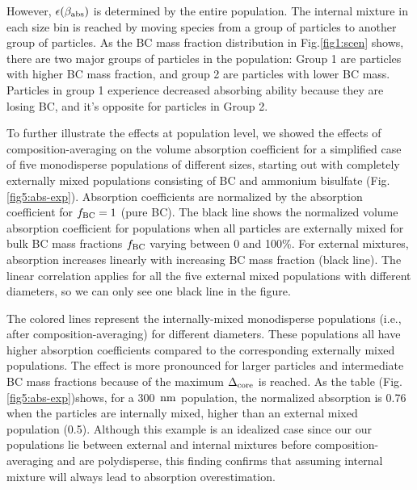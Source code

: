 \documentclass[edeposit,fullpage]{uiucthesis2009}
\makeatletter
\DeclareRobustCommand*\unit[1]
 {\ensuremath{%
   {\thinmuskip3mu\relax
    \def\mu{\text{\textmu}}\def~{\,}%
    \ifx\f@series\testbx\mathbf{#1}\else\mathrm{#1}\fi}}}
\makeatother
\begin{document}

However, $\epsilon(\beta_{\rm abs})$ is determined by the entire
population. The internal mixture in each size bin is reached by
moving species from a group of particles to another group of
particles.  As the BC mass fraction distribution  in
Fig.\ref{fig1:scen} shows, there are two major groups of particles in
the population: Group 1 are particles with higher BC mass fraction,
and group 2 are particles with lower BC mass. Particles in group 1
experience decreased absorbing ability because they are losing BC, and
it's opposite for particles in Group 2.

To further illustrate the effects at population level, we showed the effects of
composition-averaging on the volume absorption coefficient for a
simplified case of five monodisperse populations of different sizes, starting out with
completely externally mixed populations 
consisting of BC and ammonium bisulfate (Fig.\ref{fig5:abs-exp}). Absorption coefficients are normalized by
the absorption coefficient for $f_{\rm BC} = 1$ (pure BC). The black line shows the
normalized volume absorption coefficient for populations when all
particles are externally mixed for bulk BC mass fractions $f_{\rm BC}$
varying between 0 and 100\%. For external mixtures, absorption increases linearly with increasing BC
mass fraction (black line). The linear correlation applies for all the five external mixed populations with
different diameters, so we can only see one black line in the figure. 

The colored lines represent the internally-mixed monodisperse
populations (i.e., after composition-averaging) for different
diameters. These populations all have higher absorption coefficients
compared to the corresponding externally mixed populations. The effect
is more pronounced for larger particles and intermediate BC mass
fractions because of the maximum $\Delta_{\rm core}$ is reached. As the table (Fig.\ref{fig5:abs-exp})shows,
for a 300~\unit{nm} population, the normalized absorption is 0.76 when the particles are internally mixed, higher 
than an external mixed population (0.5). Although this example is an idealized case since our our populations
lie between external and internal mixtures before
composition-averaging and are polydisperse, this finding confirms that
assuming internal mixture will always lead to absorption
overestimation.
\end{document}
